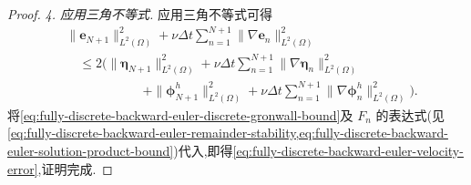 \begin{proof}
\textit{4. 应用三角不等式.} 应用三角不等式可得
\[
\begin{aligned}
 &\|\bm{e}_{N+1}\|_{L^2(\Omega)}^2
     +\nu\Delta t\sum_{n=1}^{N+1}
         \|\nabla\bm{e}_n\|_{L^2(\Omega)}^2\\
 &\quad\le2\Biggl(
       \|\symbf{\eta}_{N+1}\|_{L^2(\Omega)}^2
       +\nu\Delta t\sum_{n=1}^{N+1}
          \|\nabla\symbf{\eta}_n\|_{L^2(\Omega)}^2\\
 &\hspace{6em}+\|\symbf{\phi}_{N+1}^h\|_{L^2(\Omega)}^2
       +\nu\Delta t\sum_{n=1}^{N+1}
          \|\nabla\symbf{\phi}_n^h\|_{L^2(\Omega)}^2\Biggr).
\end{aligned}
\]
将\cref{eq:fully-discrete-backward-euler-discrete-gronwall-bound}及 $F_n$ 的表达式(见\cref{eq:fully-discrete-backward-euler-remainder-stability,eq:fully-discrete-backward-euler-solution-product-bound})代入,即得\cref{eq:fully-discrete-backward-euler-velocity-error},证明完成.
\end{proof}

